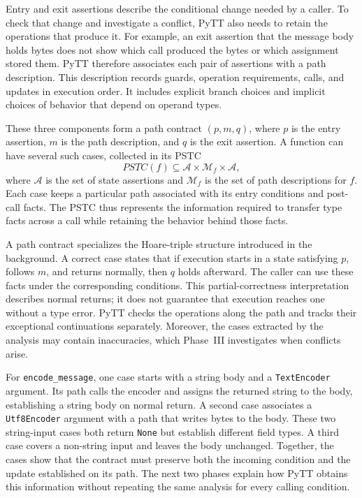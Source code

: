 

Entry and exit assertions describe the conditional change needed by a
caller. To check that change and investigate a conflict, PyTT also needs
to retain the operations that produce it. For example, an exit assertion
that the message body holds bytes does not show which call produced the
bytes or which assignment stored them. PyTT therefore associates each
pair of assertions with a path description. This description records
guards, operation requirements, calls, and updates in execution order.
It includes explicit branch choices and implicit choices of behavior
that depend on operand types.

These three components form a path contract $(p,m,q)$, where $p$ is the
entry assertion, $m$ is the path description, and $q$ is the exit
assertion. A function can have several such cases, collected in its PSTC
\[
    \mathit{PSTC}(f)\subseteq
    \mathcal{A}\times\mathcal{M}_f\times\mathcal{A},
\]
where $\mathcal{A}$ is the set of state assertions and
$\mathcal{M}_f$ is the set of path descriptions for $f$. Each case keeps
a particular path associated with its entry conditions and post-call
facts. The PSTC thus represents the information required to transfer
type facts across a call while retaining the behavior behind those facts.

A path contract specializes the Hoare-triple structure introduced in the
background. A correct case states that if execution starts in a state
satisfying $p$, follows $m$, and returns normally, then $q$ holds
afterward. The caller can use these facts under the corresponding
conditions. This partial-correctness interpretation describes normal
returns; it does not guarantee that execution reaches one without a type
error. PyTT checks the operations along the path and tracks their
exceptional continuations separately. Moreover, the cases extracted by
the analysis may contain inaccuracies, which Phase~III investigates when
conflicts arise.

For \texttt{encode\_message}, one case starts with a string body and a
\texttt{TextEncoder} argument. Its path calls the encoder and assigns the
returned string to the body, establishing a string body on normal return.
A second case associates a \texttt{Utf8Encoder} argument with a path that
writes bytes to the body. These two string-input cases both return
\texttt{None} but establish different field types. A third case covers a
non-string input and leaves the body unchanged. Together, the cases show
that the contract must preserve both the incoming condition and the
update established on its path. The next two phases explain how PyTT
obtains this information without repeating the same analysis for every
calling condition.


